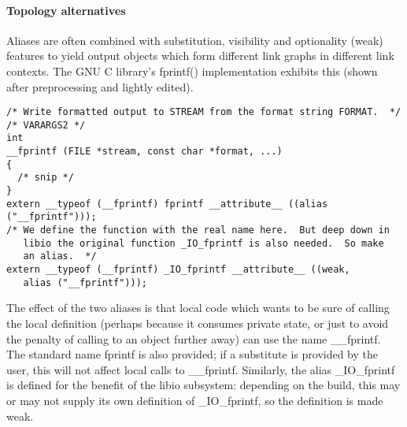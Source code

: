 \paragraph{Topology alternatives}
Aliases are often combined with substitution, visibility and optionality (weak) features 
to yield output objects which 
form different link graphs in different link contexts.
The GNU C library's \textsf{fprintf()} implementation
exhibits this (shown after preprocessing and lightly edited).

{\scriptsize\begin{lstlisting}
/* Write formatted output to STREAM from the format string FORMAT.  */
/* VARARGS2 */
int
__fprintf (FILE *stream, const char *format, ...)
{
  /* snip */
}
extern __typeof (__fprintf) fprintf __attribute__ ((alias ("__fprintf")));
/* We define the function with the real name here.  But deep down in
   libio the original function _IO_fprintf is also needed.  So make
   an alias.  */
extern __typeof (__fprintf) _IO_fprintf __attribute__ ((weak, 
   alias ("__fprintf")));
\end{lstlisting}}

The effect of the two aliases is that
local code which wants to be sure of calling the local definition
(perhaps because it consumes private state, or just to avoid the penalty 
of calling to an object further away) 
can use the name \textsf{\_\_fprintf}.
The standard name \textsf{fprintf} is also provided;
if a substitute is provided by the user, this will not affect
local calls to \textsf{\_\_fprintf}.
Similarly, the alias \textsf{\_IO\_fprintf} is defined
for the benefit of the \textsf{libio} subsystem: 
depending on the build,
this may or may not supply its own definition of \textsf{\_IO\_fprintf},
so the definition is made weak.

